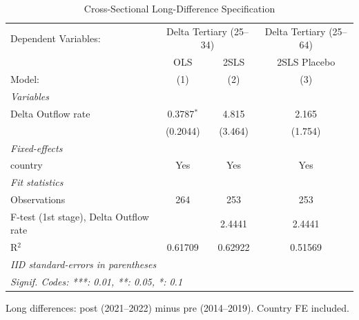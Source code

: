 \begin{table}[htbp]
   \caption{\label{tab:cross_section} Cross-Sectional Long-Difference Specification}
   \centering
   \scriptsize
   \begin{tabular}{lccc}
      \tabularnewline \midrule \midrule
      Dependent Variables: & \multicolumn{2}{c}{Delta Tertiary (25--34)} & Delta Tertiary (25--64)\\
                                             & OLS          & 2SLS    & 2SLS Placebo \\   
      Model:                                 & (1)          & (2)     & (3)\\  
      \midrule
      \emph{Variables}\\
      Delta Outflow rate                     & 0.3787$^{*}$ & 4.815   & 2.165\\   
                                             & (0.2044)     & (3.464) & (1.754)\\   
      \midrule
      \emph{Fixed-effects}\\
      country                                & Yes          & Yes     & Yes\\  
      \midrule
      \emph{Fit statistics}\\
      Observations                           & 264          & 253     & 253\\  
      F-test (1st stage), Delta Outflow rate &              & 2.4441  & 2.4441\\  
      R$^2$                                  & 0.61709      & 0.62922 & 0.51569\\  
      \midrule \midrule
      \multicolumn{4}{l}{\emph{IID standard-errors in parentheses}}\\
      \multicolumn{4}{l}{\emph{Signif. Codes: ***: 0.01, **: 0.05, *: 0.1}}\\
   \end{tabular}
   
   \par \raggedright 
   Long differences: post (2021--2022) minus pre (2014--2019). Country FE included.
\end{table}
